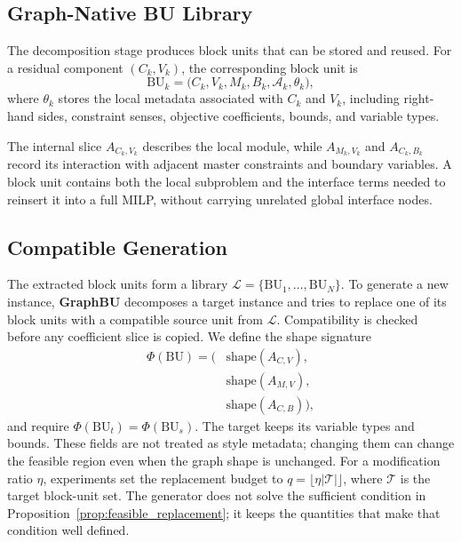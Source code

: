\documentclass[letterpaper]{article}
\newcommand{\method}{\textbf{GraphBU}\xspace}
\begin{document}
\subsection{Graph-Native BU Library}

The decomposition stage produces block units that can be stored and reused. For a residual component $(C_k,V_k)$, the corresponding block unit is
\begin{equation}
\mathrm{BU}_k =
\big(C_k,V_k,M_k,B_k,\mathcal{A}_k,\theta_k\big),
\end{equation}
where $\theta_k$ stores the local metadata associated with $C_k$ and $V_k$, including right-hand sides, constraint senses, objective coefficients, bounds, and variable types.

The internal slice $A_{C_k,V_k}$ describes the local module, while $A_{M_k,V_k}$ and $A_{C_k,B_k}$ record its interaction with adjacent master constraints and boundary variables. A block unit contains both the local subproblem and the interface terms needed to reinsert it into a full MILP, without carrying unrelated global interface nodes.

\subsection{Compatible Generation}

The extracted block units form a library $\mathcal{L}=\{\mathrm{BU}_1,\ldots,\mathrm{BU}_N\}$. To generate a new instance, \method decomposes a target instance and tries to replace one of its block units with a compatible source unit from $\mathcal{L}$. Compatibility is checked before any coefficient slice is copied. We define the shape signature
\begin{equation}
\begin{aligned}
\Phi(\mathrm{BU}) =
\big(&\mathrm{shape}(A_{C,V}),\\
&\mathrm{shape}(A_{M,V}),\\
&\mathrm{shape}(A_{C,B})\big),
\end{aligned}
\end{equation}
and require $\Phi(\mathrm{BU}_t)=\Phi(\mathrm{BU}_s)$.
The target keeps its variable types and bounds. These fields are not treated as style metadata; changing them can change the feasible region even when the graph shape is unchanged. For a modification ratio $\eta$, experiments set the replacement budget to $q=\lfloor\eta |\mathcal{T}|\rfloor$, where $\mathcal{T}$ is the target block-unit set. The generator does not solve the sufficient condition in Proposition~\ref{prop:feasible_replacement}; it keeps the quantities that make that condition well defined.
\end{document}
